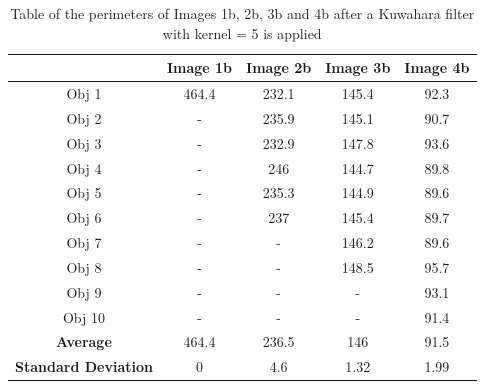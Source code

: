 \documentclass[runningheads]{llncs}
\begin{document}
\begin{table}[h!]
\centering
\begin{tabular}{|c|c|c|c|c|}
\hline
\textbf{} & \textbf{Image 1b} & \textbf{Image 2b} & \textbf{Image 3b} & \textbf{Image 4b} \\
\hline
Obj 1 & 464.4     & 232.1  & 145.4 &  92.3 \\ \hline
Obj 2 &  -          & 235.9  & 145.1 & 90.7\\ \hline
Obj 3 &   -         & 232.9 & 147.8 &  93.6\\ \hline
Obj 4 &   -         & 246  & 144.7 &  89.8\\ \hline
Obj 5 &   -         & 235.3 &  144.9 &  89.6\\ \hline
Obj 6 &   -         & 237 & 145.4 &  89.7\\ \hline
Obj 7 &   -         &  -     & 146.2 &  89.6\\ \hline
Obj 8 &   -         &  -     & 148.5 &  95.7 \\ \hline
Obj 9 &    -        &  -     &  -    & 93.1\\ \hline
Obj 10 &  -          &  -     &  -    & 91.4\\ \hline
\textbf{Average} &  464.4  &  236.5   &   146   & 91.5  \\ \hline
\textbf{Standard Deviation} &  0      &  4.6   &    1.32 & 1.99 \\ \hline
\end{tabular}
\caption{Table of the perimeters of Images 1b, 2b, 3b and 4b after a Kuwahara filter with kernel = 5 is applied}
\label{tab:Perimeter-SeriesB-Kuwahara5}
\end{table}
\end{document}
